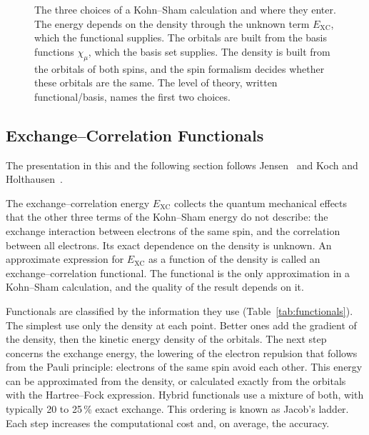 \begin{figure}[h]
{%
}
\caption{The three choices of a Kohn--Sham calculation and where they enter.
The energy depends on the density through the unknown term $E_\text{XC}$,
which the functional supplies. The orbitals are built from the basis
functions $\chi_\mu$, which the basis set supplies. The density is built
from the orbitals of both spins, and the spin formalism decides whether
these orbitals are the same. The level of theory, written functional/basis,
names the first two choices.}
\label{fig:choices}
\end{figure}

\subsection{Exchange--Correlation Functionals}
\label{sec:background-functionals}

The presentation in this and the following section follows
Jensen~\cite{jensen2017} and Koch and Holthausen~\cite{koch2001}.

The exchange--correlation energy $E_\text{XC}$ collects the quantum
mechanical effects that the other three terms of the Kohn--Sham energy do
not describe: the exchange interaction between electrons of the same spin,
and the correlation between all electrons. Its exact dependence on the
density is unknown. An approximate expression for $E_\text{XC}$ as a
function of the density is called an exchange--correlation functional. The
functional is the only approximation in a Kohn--Sham calculation, and the
quality of the result depends on it.

Functionals are classified by the information they use
(Table~\ref{tab:functionals}). The simplest use only the density at each
point. Better ones add the gradient of the density, then the kinetic energy
density of the orbitals. The next step concerns the exchange energy, the
lowering of the electron repulsion that follows from the Pauli principle:
electrons of the same spin avoid each other. This energy can be
approximated from the density, or calculated exactly from the orbitals with
the Hartree--Fock expression. Hybrid functionals use a mixture of both, with
typically 20 to 25\,\% exact exchange. This ordering is known as Jacob's
ladder. Each step increases the computational cost and, on average, the
accuracy.


